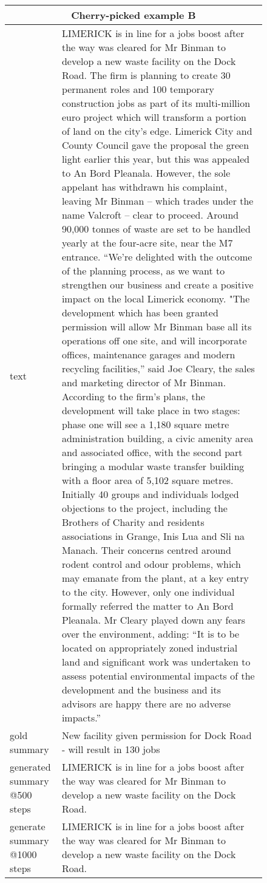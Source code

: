 \documentclass[11pt,a4paper]{article}
\begin{document}
\clearpage
\begin{figure*}[t]
    \centering
    \begin{adjustbox}{width=\textwidth}
    \begin{tabular}{|p{}|p{}|}
    \hline
    \multicolumn{2}{|c|}{\textbf{Cherry-picked example B}} \\
    \hline
    text & LIMERICK is in line for a jobs boost after the way was cleared for Mr Binman to develop a new waste facility on the Dock Road. The firm is planning to create 30 permanent roles and 100 temporary construction jobs as part of its multi-million euro project which will transform a portion of land on the city’s edge. Limerick City and County Council gave the proposal the green light earlier this year, but this was appealed to An Bord Pleanala. However, the sole appelant has withdrawn his complaint, leaving Mr Binman – which trades under the name Valcroft – clear to proceed. Around 90,000 tonnes of waste are set to be handled yearly at the four-acre site, near the M7 entrance. “We’re delighted with the outcome of the planning process, as we want to strengthen our business and create a positive impact on the local Limerick economy. "The development which has been granted permission will allow Mr Binman base all its operations off one site, and will incorporate offices, maintenance garages and modern recycling facilities,” said Joe Cleary, the sales and marketing director of Mr Binman. According to the firm’s plans, the development will take place in two stages: phase one will see a 1,180 square metre administration building, a civic amenity area and associated office, with the second part bringing a modular waste transfer building with a floor area of 5,102 square metres. Initially 40 groups and individuals lodged objections to the project, including the Brothers of Charity and residents associations in Grange, Inis Lua and Sli na Manach. Their concerns centred around rodent control and odour problems, which may emanate from the plant, at a key entry to the city. However, only one individual formally referred the matter to An Bord Pleanala. Mr Cleary played down any fears over the environment, adding: “It is to be located on appropriately zoned industrial land and significant work was undertaken to assess potential environmental impacts of the development and the business and its advisors are happy there are no adverse impacts.”\\
    \hline
    gold summary & 	
    New facility given permission for Dock Road - will result in 130 jobs \\
    \hline
    generated summary @500 steps & LIMERICK is in line for a jobs boost after the way was cleared for Mr Binman to develop a new waste facility on the Dock Road.\\
    \hline
    generate summary @1000 steps & LIMERICK is in line for a jobs boost after the way was cleared for Mr Binman to develop a new waste facility on the Dock Road.\\
    \hline
    \end{tabular}
    \end{adjustbox}

    \end{figure*}
\end{document}
